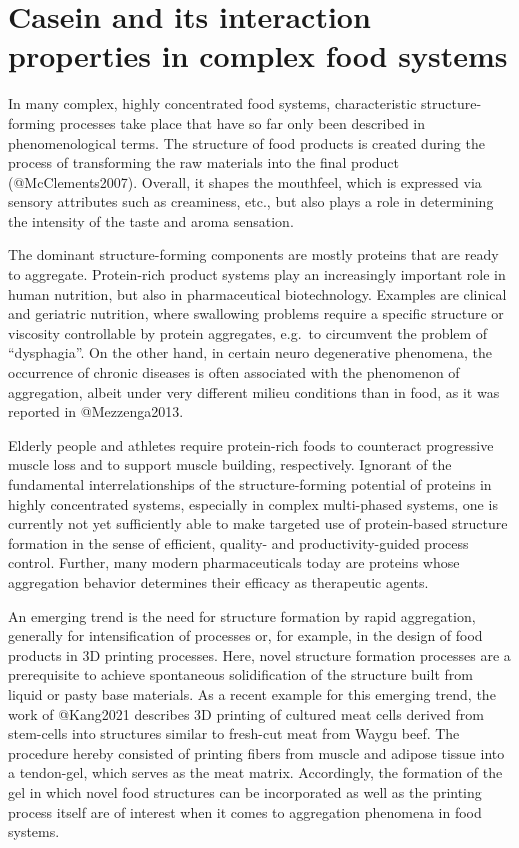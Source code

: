 \documentclass[
]{article}
\author{}
\date{\vspace{-2.5em}}
\begin{document}
\section{Casein and its interaction properties in complex food systems}

In many complex, highly concentrated food systems, characteristic
structure-forming processes take place that have so far only been
described in phenomenological terms. The structure of food products is
created during the process of transforming the raw materials into the
final product (@McClements2007). Overall, it shapes the mouthfeel, which
is expressed via sensory attributes such as creaminess, etc., but also
plays a role in determining the intensity of the taste and aroma
sensation.

The dominant structure-forming components are mostly proteins that are
ready to aggregate. Protein-rich product systems play an increasingly
important role in human nutrition, but also in pharmaceutical
biotechnology. Examples are clinical and geriatric nutrition, where
swallowing problems require a specific structure or viscosity
controllable by protein aggregates, e.g.~to circumvent the problem of
``dysphagia''. On the other hand, in certain neuro degenerative
phenomena, the occurrence of chronic diseases is often associated with
the phenomenon of aggregation, albeit under very different milieu
conditions than in food, as it was reported in @Mezzenga2013.

Elderly people and athletes require protein-rich foods to counteract
progressive muscle loss and to support muscle building, respectively.
Ignorant of the fundamental interrelationships of the structure-forming
potential of proteins in highly concentrated systems, especially in
complex multi-phased systems, one is currently not yet sufficiently able
to make targeted use of protein-based structure formation in the sense
of efficient, quality- and productivity-guided process control. Further,
many modern pharmaceuticals today are proteins whose aggregation
behavior determines their efficacy as therapeutic agents.

An emerging trend is the need for structure formation by rapid
aggregation, generally for intensification of processes or, for example,
in the design of food products in 3D printing processes. Here, novel
structure formation processes are a prerequisite to achieve spontaneous
solidification of the structure built from liquid or pasty base
materials. As a recent example for this emerging trend, the work of
@Kang2021 describes 3D printing of cultured meat cells derived from
stem-cells into structures similar to fresh-cut meat from Waygu beef.
The procedure hereby consisted of printing fibers from muscle and
adipose tissue into a tendon-gel, which serves as the meat matrix.
Accordingly, the formation of the gel in which novel food structures can
be incorporated as well as the printing process itself are of interest
when it comes to aggregation phenomena in food systems.
\end{document}
